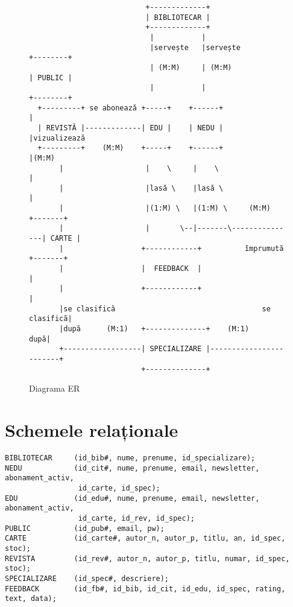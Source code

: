 \begin{figure}[!htbp]
    \small
    \begin{verbatim}
                           +-------------+
                           | BIBLIOTECAR |
                           +-------------+
                            |           |
                            |servește   |servește              +--------+ 
                            | (M:M)     | (M:M)                | PUBLIC |
                            |           |                      +--------+
  +---------+ se abonează +-----+    +------+                      |
  | REVISTĂ |-------------| EDU |    | NEDU |                      |vizualizează
  +---------+    (M:M)    +-----+    +------+                      |(M:M)
       |                   |    \     |    \                       |
       |                   |lasă \    |lasă \                      |
       |                   |(1:M) \   |(1:M) \     (M:M)      +-------+
       |                   |       \--|-------\---------------| CARTE |
       |                  +------------+          împrumută   +-------+
       |                  |  FEEDBACK  |                          |
       |                  +------------+                          |
       |se clasifică                                  se clasifică|
       |după      (M:1)   +--------------+    (M:1)           după|
       +------------------| SPECIALIZARE |------------------------+
                          +--------------+
    \end{verbatim}
    \caption{Diagrama ER}
    \label{fig:erd}
\end{figure}


\section{Schemele relaționale}
\label{sec:scheme-rel}

\begin{verbatim}
BIBLIOTECAR     (id_bib#, nume, prenume, id_specializare);
NEDU            (id_cit#, nume, prenume, email, newsletter, abonament_activ,
                 id_carte, id_spec);
EDU             (id_edu#, nume, prenume, email, newsletter, abonament_activ,
                 id_carte, id_rev, id_spec);
PUBLIC          (id_pub#, email, pw);
CARTE           (id_carte#, autor_n, autor_p, titlu, an, id_spec, stoc);
REVISTA         (id_rev#, autor_n, autor_p, titlu, numar, id_spec, stoc);
SPECIALIZARE    (id_spec#, descriere);
FEEDBACK        (id_fb#, id_bib, id_cit, id_edu, id_spec, rating, text, data);
\end{verbatim}

